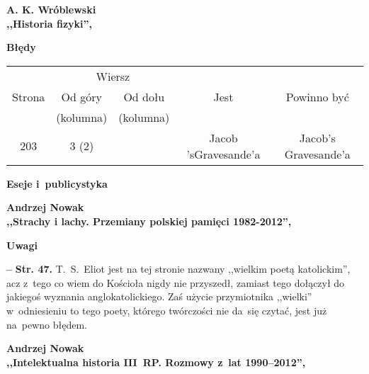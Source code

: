 \documentclass[a4paper,11pt]{article}
\newcommand{\spaceTwo}{2em}
\newcommand{\spaceThree}{1em}
\newcommand{\tb}{\textbf}
\newcommand{\noi}{\noindent}
\newcommand{\start}{\noi \tb{--} {}}
\newcommand{\Center}[1]{\begin{center} #1 \end{center}}
\newcommand{\CenterTB}[1]{\Center{\tb{#1}}}
\newcommand{\Str}[1]{\tb{Str. #1.}}
\newcommand{\Field}[1]{ \begin{center} {\LARGE \tb{#1} } \end{center} }
\newcommand{\Work}[1]{ \begin{center} {\large \tb{#1}} \end{center} }
\begin{document}
\vspace{\spaceTwo}





\Work{
  A. K. Wróblewski \\
  ,,Historia fizyki'', \cite{Wroblewski06} }


\CenterTB{Błędy}
\begin{center}
  \begin{tabular}{|c|c|c|c|c|}
    \hline
    & \multicolumn{2}{c|}{Wiersz} & & \\ \cline{2-3}
    Strona & Od góry & Od dołu & Jest & Powinno być \\
    & (kolumna) & (kolumna) & & \\ \hline
    203 & 3 (2) & & Jacob 'sGravesande'a & Jacob's Gravesande'a \\
    \hline
  \end{tabular}
\end{center}

\vspace{\spaceTwo}





\newpage
\Field{Eseje i~publicystyka}

\vspace{\spaceTwo} \vspace{\spaceThree}



\Work{
  Andrzej Nowak \\
  ,,Strachy i lachy. Przemiany polskiej pamięci 1982-2012'',
  \cite{Nowak12} }


\CenterTB{Uwagi}

\start \Str{47} T.~S.~Eliot jest na tej stronie nazwany ,,wielkim
poetą katolickim'', acz z~tego co wiem do Kościoła nigdy nie
przyszedł, zamiast tego dołączył do jakiegoś wyznania
anglokatolickiego. Zaś użycie przymiotnika ,,wielki'' w~odniesieniu to
tego poety, którego twórczości nie da~się czytać, jest już na~pewno
błędem.

\vspace{\spaceTwo}





\Work{
  Andrzej Nowak \\
  ,,Intelektualna historia III~RP. Rozmowy z~lat 1990--2012'',
  \cite{Nowak13} }
\end{document}
